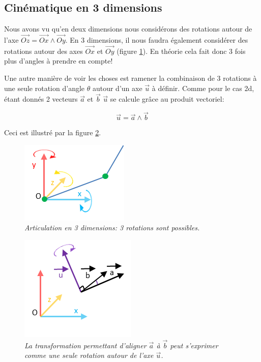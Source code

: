 \documentclass{article}
\begin{document}
\subsection{Cin\'ematique en 3 dimensions}
Nous avons vu qu'en deux dimensions nous consid\'erons des rotations autour de l'axe $\vec{Oz} = \vec{Ox} \wedge \vec{Oy}$.
En 3 dimensions, il nous faudra \'egalement consid\'erer des rotations autour des axes $\vec{Ox}$ et $\vec{Oy}$ (figure \ref{rot3d}).
En th\'eorie cela fait donc 3 fois plus d'angles \`a prendre en compte!

Une autre mani\`ere de voir les choses est ramener la combinaison de 3 rotations \`a une seule rotation d'angle $\theta$ autour
d'un axe $\vec{u}$ \`a d\'efinir. Comme pour le cas 2d, \'etant donn\'es 2 vecteurs $\vec{a}$ et $\vec{b}$ $\vec{u}$ se calcule gr\^ace au produit vectoriel:

\begin{displaymath}
\vec{u} = \vec{a} \wedge \vec{b}
\end{displaymath}

Ceci est illustr\'e par la figure \ref{rot3dUnAxe}.

 \begin{figure}[htb]
  \centering
    \includegraphics[]{rot3d}
  \caption{
          \textit{Articulation en 3 dimensions: 3 rotations sont possibles.}}
		   \label{rot3d}
\end{figure}
 
  \begin{figure}[htb]
  \centering
    \includegraphics[]{rot3dUnAxe}
  \caption{
          \textit{La transformation permettant d'aligner $\vec{a}$ \`a $\vec{b}$ peut s'exprimer comme une seule rotation autour de l'axe $\vec{u}$.}}
		   \label{rot3dUnAxe}
\end{figure}
 
\end{document}
